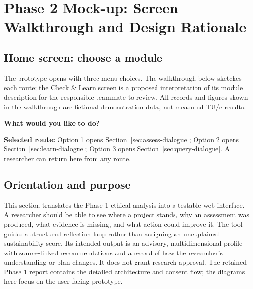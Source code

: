 \clearpage
\section{Phase 2 Mock-up: Screen Walkthrough and Design Rationale}
\label{sec:phase2-mockup}

\subsection{Home screen: choose a module}
\label{sec:phase2-home}
The prototype opens with three menu choices. The walkthrough below sketches each route; the Check \& Learn screen is a proposed interpretation of its module description for the responsible teammate to review. All records and figures shown in the walkthrough are fictional demonstration data, not measured TU/e results.

\begin{tcolorbox}[colback=gray!3,colframe=black!55,title={Home --- AI for a Greener Research Future},breakable]
\textbf{What would you like to do?}\par\medskip
{}\quad
{}\quad
{}\par\medskip
\textbf{Selected route:} Option 1 opens Section~\ref{sec:assess-dialogue}; Option 2 opens Section~\ref{sec:learn-dialogue}; Option 3 opens Section~\ref{sec:query-dialogue}. A researcher can return here from any route.
\end{tcolorbox}





\clearpage
\subsection{Orientation and purpose}
This section translates the Phase 1 ethical analysis into a testable web interface. A researcher should be able to see where a project stands, why an assessment was produced, what evidence is missing, and what action could improve it. The tool guides a structured reflection loop rather than assigning an unexplained sustainability score. Its intended output is an advisory, multidimensional profile with source-linked recommendations and a record of how the researcher's understanding or plan changes. It does not grant research approval. The retained Phase 1 report contains the detailed architecture and consent flow; the diagrams here focus on the user-facing prototype.

